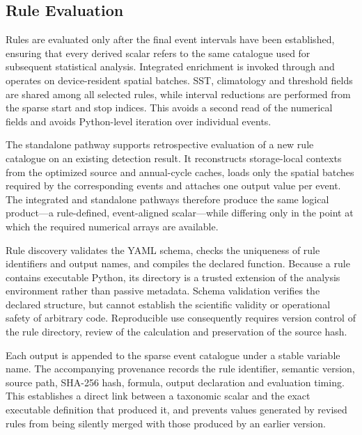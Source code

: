 \subsection{Rule Evaluation}

Rules are evaluated only after the final event intervals have been established, ensuring that every derived scalar refers to the same catalogue used for subsequent statistical analysis. Integrated enrichment is invoked through  and operates on device-resident spatial batches. SST, climatology and threshold fields are shared among all selected rules, while interval reductions are performed from the sparse start and stop indices. This avoids a second read of the numerical fields and avoids Python-level iteration over individual events.

The standalone  pathway supports retrospective evaluation of a new rule catalogue on an existing detection result. It reconstructs storage-local contexts from the optimized source and annual-cycle caches, loads only the spatial batches required by the corresponding events and attaches one output value per event. The integrated and standalone pathways therefore produce the same logical product---a rule-defined, event-aligned scalar---while differing only in the point at which the required numerical arrays are available.

Rule discovery validates the YAML schema, checks the uniqueness of rule identifiers and output names, and compiles the declared  function. Because a rule contains executable Python, its directory is a trusted extension of the analysis environment rather than passive metadata. Schema validation verifies the declared structure, but cannot establish the scientific validity or operational safety of arbitrary code. Reproducible use consequently requires version control of the rule directory, review of the calculation and preservation of the source hash.

Each output is appended to the sparse event catalogue under a stable variable name. The accompanying provenance records the rule identifier, semantic version, source path, SHA-256 hash, formula, output declaration and evaluation timing. This establishes a direct link between a taxonomic scalar and the exact executable definition that produced it, and prevents values generated by revised rules from being silently merged with those produced by an earlier version.


